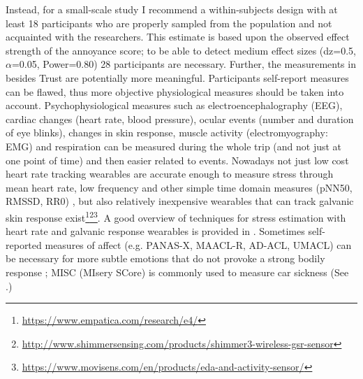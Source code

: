 Instead, for a small-scale study I recommend a within-subjects design with at least 18 participants who are properly sampled from the population and not acquainted with the researchers. This estimate is based upon the observed effect strength of the annoyance score; to be able to detect medium effect sizes (dz=0.5, \(\alpha\)=0.05, Power=0.80) 28 participants are necessary. Further, the measurements in  besides Trust are potentially more meaningful. Participants self-report measures can be flawed, thus more objective physiological measures should be taken into account.  Psychophysiological measures such as electroencephalography (EEG), cardiac changes (heart rate, blood pressure), ocular events (number and duration of eye blinks), changes in skin response, muscle activity (electromyography: EMG) and respiration \cite{Tichon2014PhysiologicalTraining} can be measured during the whole trip (and not just at one point of time) and then easier related to events. Nowadays not just low cost heart rate tracking wearables are accurate enough to measure stress through mean heart rate, low frequency and other simple time domain measures (pNN50, RMSSD, RR0) \cite{Salai2016}, but also relatively inexpensive wearables that can track galvanic skin response exist\footnote{\url{https://www.empatica.com/research/e4/}}\fnsep\footnote{\url{http://www.shimmersensing.com/products/shimmer3-wireless-gsr-sensor}}\fnsep\footnote{\url{https://www.movisens.com/en/products/eda-and-activity-sensor/}}. A good overview of techniques for stress estimation with heart rate and galvanic response wearables is provided in \cite{Ollander2015WearableEstimation}. Sometimes self-reported measures of affect (e.g. PANAS-X, MAACL-R, AD-ACL, UMACL) can be necessary for more subtle emotions that do not provoke a strong bodily response \cite{Boyle2015MeasuresDimensions}; MISC (MIsery SCore) is commonly used to measure car sickness (See .)

